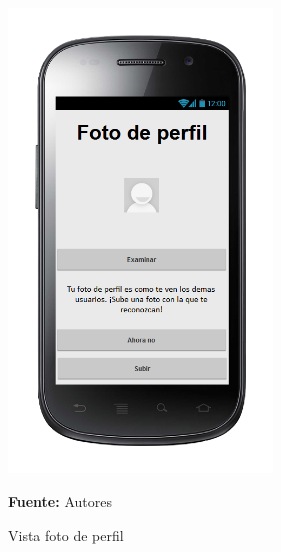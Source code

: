 \begin{figure}[!htb]
  \begin{center}
\includegraphics[width=7cm]{./imagenes/UI/Usuarios/foto_de_perfil.png}
    \caption{Vista foto de perfil}
    \label{fig:Vista_foto_de_perfil}
    \textbf{Fuente:}  Autores
  \end{center}
\end{figure}
